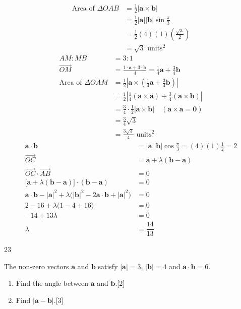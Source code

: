\documentclass[a4paper,11pt,oneside]{book}
\makeatletter
\newcounter{wq}[section]
\renewcommand{\thesection}{\arabic{section}}
\newcommand{\Q}[1]{\par\needspace{5\baselineskip}\medskip\stepcounter{wq}\noindent\textbf{\thewq}\quad #1\par}
\newcommand{\wrow}[1]{\ri@row{#1}}
\newcommand{\wsolf}[1]{\vspace{-2ex}\xdef\ri@qid{ws\thesection q\thewq}\expandafter\gdef\csname ri@hp@\ri@qid\endcsname{}\begin{risol}#1\par\end{risol}}
\makeatother
\begin{document}
\wsolf{\wrow{(a)}\begin{align*}\text{Area of }\Delta OAB&=\tfrac12|\mathbf a\times\mathbf b|\\ &=\tfrac12|\mathbf a||\mathbf b|\sin\tfrac{\pi}{3}\\ &=\tfrac12(4)(1)\left(\tfrac{\sqrt3}{2}\right)\\ &=\sqrt3\text{ units}^2\end{align*}
\wrow{(b)}\begin{align*}AM:MB&=3:1\\ \overrightarrow{OM}&=\tfrac{1\cdot\mathbf a+3\cdot\mathbf b}{4}=\tfrac14\mathbf a+\tfrac34\mathbf b\\ \text{Area of }\Delta OAM&=\tfrac12\left|\mathbf a\times\left(\tfrac14\mathbf a+\tfrac34\mathbf b\right)\right|\\ &=\tfrac12\left|\tfrac14(\mathbf a\times\mathbf a)+\tfrac34(\mathbf a\times\mathbf b)\right|\\ &=\tfrac34\cdot\tfrac12|\mathbf a\times\mathbf b|\quad(\mathbf a\times\mathbf a=\mathbf 0)\\ &=\tfrac34\sqrt3\\ &=\tfrac{3\sqrt3}{4}\text{ units}^2\end{align*}
\wrow{(c)}\begin{align*}\mathbf a\cdot\mathbf b&=|\mathbf a||\mathbf b|\cos\tfrac{\pi}{3}=(4)(1)\tfrac12=2\\ \overrightarrow{OC}&=\mathbf a+\lambda(\mathbf b-\mathbf a)\\ \overrightarrow{OC}\cdot\overrightarrow{AB}&=0\\ \bigl[\mathbf a+\lambda(\mathbf b-\mathbf a)\bigr]\cdot(\mathbf b-\mathbf a)&=0\\ \mathbf a\cdot\mathbf b-|\mathbf a|^2+\lambda\bigl(|\mathbf b|^2-2\mathbf a\cdot\mathbf b+|\mathbf a|^2\bigr)&=0\\ 2-16+\lambda\bigl(1-4+16\bigr)&=0\\ -14+13\lambda&=0\\ \lambda&=\dfrac{14}{13}\end{align*}}
\clearpage
\expandafter\gdef\csname ri@mk@ws9q2(a)\endcsname{2}\expandafter\gdef\csname ri@mk@ws9q2(b)\endcsname{3}
\Q{The non-zero vectors $\mathbf a$ and $\mathbf b$ satisfy $|\mathbf a|=3$, $|\mathbf b|=4$ and $\mathbf a\cdot\mathbf b=6$.\begin{enumerate}[label=\textbf{(\alph*)},leftmargin=2.2em,itemsep=3pt]\item Find the angle between $\mathbf a$ and $\mathbf b$.\hfill[2]\item Find $|\mathbf a-\mathbf b|$.\hfill[3]\end{enumerate}}
\end{document}
